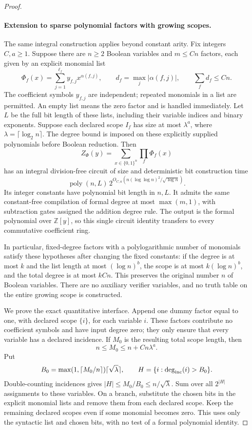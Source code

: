 \begin{proof}
\paragraph{Extension to sparse polynomial factors with growing scopes.}
The same integral construction applies beyond constant arity.
Fix integers $C,a\ge1$.  Suppose there are $n\ge2$ Boolean variables
and $m\le Cn$ factors, each given by an explicit monomial list
\[
 \Phi_f(x)=\sum_{j=1}^{\ell_f}y_{f,j}x^{\alpha(f,j)},
 \qquad d_f=\max_j|\alpha(f,j)|,
 \qquad \sum_f d_f\le Cn.
\]
The coefficient symbols $y_{f,j}$ are independent; repeated
monomials in a list are permitted.  An empty list means the zero
factor and is handled immediately.  Let $L$ be the full bit length
of these lists, including their variable indices and binary
exponents.  Suppose each declared scope $I_f$ has size at most
$\lambda^a$, where $\lambda=\lceil\log_2 n\rceil$.
The degree bound is imposed on these explicitly supplied
polynomials before Boolean reduction.  Then
\[
 Z_{\Phi}(y)=\sum_{x\in\{0,1\}^n}\prod_f\Phi_f(x)
\]
has an integral division-free circuit of size and deterministic
bit construction time
\[
 \operatorname{poly}(n,L)\,
 2^{O_{C,a}(n(\log\log n)^2/\sqrt{\log n})}.
\]
Its integer constants have polynomial bit length in $n,L$.
It admits the same constant-free compilation of formal degree
at most $\max(m,1)$, with subtraction gates assigned the
addition degree rule.  The output is the formal polynomial
over $\mathbb Z[y]$, so this single circuit identity transfers
to every commutative coefficient ring.

In particular, fixed-degree factors with a polylogarithmic
number of monomials satisfy these hypotheses after changing
the fixed constants: if the degree is at most $k$ and the
list length at most $(\log n)^b$, the scope is at most
$k(\log n)^b$, and the total degree is at most $kCn$.
This preserves the original number $n$ of Boolean variables.
There are no auxiliary verifier variables, and no truth table
on the entire growing scope is constructed.

We prove the exact quantitative interface.  Append one
dummy factor equal to one, with declared scope $\{i\}$, for
each variable $i$.  These factors contribute no coefficient
symbols and have input degree zero; they only ensure that
every variable has a declared incidence.  If $M_0$ is the
resulting total scope length, then
\[
              n\le M_0\le n+Cn\lambda^a.
\]
Put
\[
 B_0=\max(1,\lceil M_0/n\rceil)\lceil\sqrt\lambda\rceil,
 \qquad H=\{i:\deg_{\rm inc}(i)>B_0\}.
\]
Double-counting incidences gives
$|H|\le M_0/B_0\le n/\sqrt\lambda$.
Sum over all $2^{|H|}$ assignments to these variables.  On a
branch, substitute the chosen bits in the explicit monomial
lists and remove them from each declared scope.  Keep the
remaining declared scopes even if some monomial becomes
zero.  This uses only the syntactic list and chosen bits,
with no test of a formal polynomial identity.


\end{proof}
